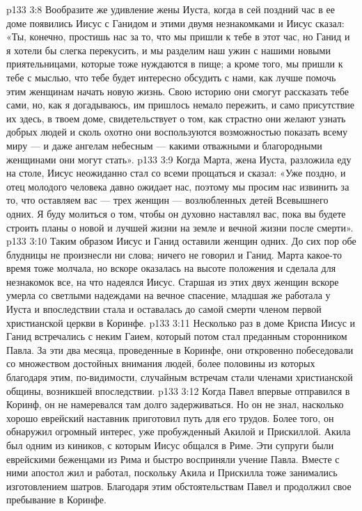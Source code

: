 \vs p133 3:8 Вообразите же удивление жены Иуста, когда в сей поздний час в ее доме появились Иисус с Ганидом и этими двумя незнакомками и Иисус сказал: «Ты, конечно, простишь нас за то, что мы пришли к тебе в этот час, но Ганид и я хотели бы слегка перекусить, и мы разделим наш ужин с нашими новыми приятельницами, которые тоже нуждаются в пище; а кроме того, мы пришли к тебе с мыслью, что тебе будет интересно обсудить с нами, как лучше помочь этим женщинам начать новую жизнь. Свою историю они смогут рассказать тебе сами, но, как я догадываюсь, им пришлось немало пережить, и само присутствие их здесь, в твоем доме, свидетельствует о том, как страстно они желают узнать добрых людей и сколь охотно они воспользуются возможностью показать всему миру --- и даже ангелам небесным --- какими отважными и благородными женщинами они могут стать».
\vs p133 3:9 Когда Марта, жена Иуста, разложила еду на столе, Иисус неожиданно стал со всеми прощаться и сказал: «Уже поздно, и отец молодого человека давно ожидает нас, поэтому мы просим нас извинить за то, что оставляем вас --- трех женщин --- возлюбленных детей Всевышнего одних. Я буду молиться о том, чтобы он духовно наставлял вас, пока вы будете строить планы о новой и лучшей жизни на земле и вечной жизни после смерти».
\vs p133 3:10 Таким образом Иисус и Ганид оставили женщин одних. До сих пор обе блудницы не произнесли ни слова; ничего не говорил и Ганид. Марта какое\hyp{}то время тоже молчала, но вскоре оказалась на высоте положения и сделала для незнакомок все, на что надеялся Иисус. Старшая из этих двух женщин вскоре умерла со светлыми надеждами на вечное спасение, младшая же работала у Иуста и впоследствии стала и оставалась до самой смерти членом первой христианской церкви в Коринфе.
\vs p133 3:11 Несколько раз в доме Криспа Иисус и Ганид встречались с неким Гаием, который потом стал преданным сторонником Павла. За эти два месяца, проведенные в Коринфе, они откровенно побеседовали со множеством достойных внимания людей, более половины из которых благодаря этим, по\hyp{}видимости, случайным встречам стали членами христианской общины, возникшей впоследствии.
\vs p133 3:12 Когда Павел впервые отправился в Коринф, он не намеревался там долго задерживаться. Но он не знал, насколько хорошо еврейский наставник приготовил путь для его трудов. Более того, он обнаружил огромный интерес, уже пробужденный Акилой и Прискиллой. Акила был одним из киников, с которым Иисус общался в Риме. Эти супруги были еврейскими беженцами из Рима и быстро восприняли учение Павла. Вместе с ними апостол жил и работал, поскольку Акила и Прискилла тоже занимались изготовлением шатров. Благодаря этим обстоятельствам Павел и продолжил свое пребывание в Коринфе.

